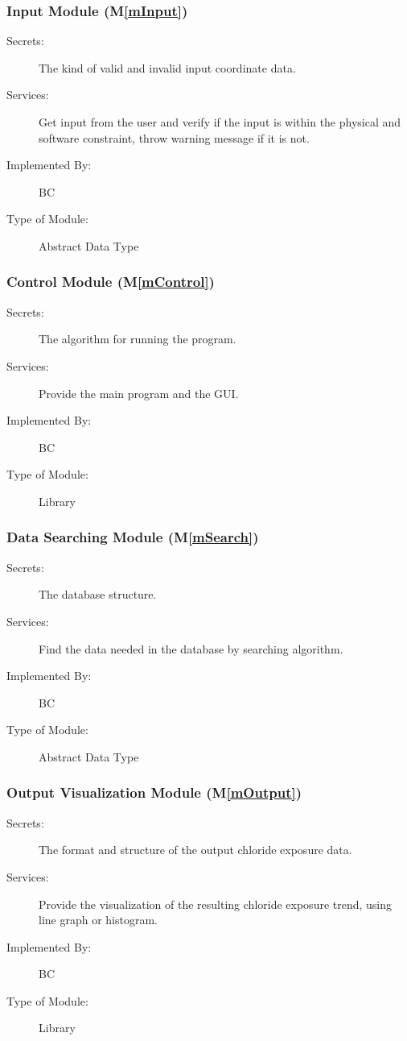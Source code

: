 \documentclass[12pt, titlepage]{article}
\newcommand{\mref}[1]{M\ref{#1}}
\begin{document}
\subsubsection{Input Module (\mref{mInput})}

\begin{description}
\item[Secrets:] The kind of valid and invalid input coordinate data. 
\item[Services:] Get input from the user and verify if the input is within the physical and software constraint, throw warning message if it is not. 
\item[Implemented By:] BC
\item[Type of Module:] Abstract Data Type
\end{description}


\subsubsection{Control Module (\mref{mControl})}
\begin{description}
\item[Secrets:] The algorithm for running the program.
\item[Services:] Provide the main program and the GUI.
\item[Implemented By:] BC
\item[Type of Module:] Library
\end{description}

\subsubsection{Data Searching Module (\mref{mSearch})}
\begin{description}
\item[Secrets:] The database structure.
\item[Services:] Find the data needed in the database by searching algorithm.
\item[Implemented By:] BC
\item[Type of Module:] Abstract Data Type
\end{description}

\subsubsection{Output Visualization Module (\mref{mOutput})}
\begin{description}
\item[Secrets:] The format and structure of the output chloride exposure data.
\item[Services:] Provide the visualization of the resulting chloride exposure trend, using line graph or histogram. 
\item[Implemented By:] BC
\item[Type of Module:] Library
\end{description}
\end{document}
